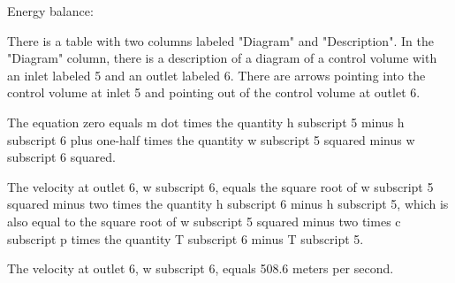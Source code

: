 Energy balance:

There is a table with two columns labeled "Diagram" and "Description". In the "Diagram" column, there is a description of a diagram of a control volume with an inlet labeled 5 and an outlet labeled 6. There are arrows pointing into the control volume at inlet 5 and pointing out of the control volume at outlet 6.

The equation zero equals m dot times the quantity h subscript 5 minus h subscript 6 plus one-half times the quantity w subscript 5 squared minus w subscript 6 squared.

The velocity at outlet 6, w subscript 6, equals the square root of w subscript 5 squared minus two times the quantity h subscript 6 minus h subscript 5, which is also equal to the square root of w subscript 5 squared minus two times c subscript p times the quantity T subscript 6 minus T subscript 5.

The velocity at outlet 6, w subscript 6, equals 508.6 meters per second.